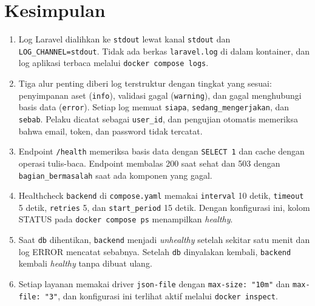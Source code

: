 \documentclass[a4paper,oneside,12pt]{report}
\begin{document}
\clearpage

\chapter{Kesimpulan}
\begin{enumerate}
    \item Log Laravel dialihkan ke \texttt{stdout} lewat kanal \texttt{stdout} dan \texttt{LOG\_CHANNEL=stdout}. Tidak ada berkas \texttt{laravel.log} di dalam kontainer, dan log aplikasi terbaca melalui \texttt{docker compose logs}.
    \item Tiga alur penting diberi log terstruktur dengan tingkat yang sesuai: penyimpanan aset (\texttt{info}), validasi gagal (\texttt{warning}), dan gagal menghubungi basis data (\texttt{error}). Setiap log memuat \texttt{siapa}, \texttt{sedang\_mengerjakan}, dan \texttt{sebab}. Pelaku dicatat sebagai \texttt{user\_id}, dan pengujian otomatis memeriksa bahwa email, token, dan password tidak tercatat.
    \item Endpoint \texttt{/health} memeriksa basis data dengan \texttt{SELECT 1} dan cache dengan operasi tulis-baca. Endpoint membalas 200 saat sehat dan 503 dengan \texttt{bagian\_bermasalah} saat ada komponen yang gagal.
    \item Healthcheck \texttt{backend} di \texttt{compose.yaml} memakai \texttt{interval} 10 detik, \texttt{timeout} 5 detik, \texttt{retries} 5, dan \texttt{start\_period} 15 detik. Dengan konfigurasi ini, kolom STATUS pada \texttt{docker compose ps} menampilkan \textit{healthy}.
    \item Saat \texttt{db} dihentikan, \texttt{backend} menjadi \textit{unhealthy} setelah sekitar satu menit dan log ERROR mencatat sebabnya. Setelah \texttt{db} dinyalakan kembali, \texttt{backend} kembali \textit{healthy} tanpa dibuat ulang.
    \item Setiap layanan memakai driver \texttt{json-file} dengan \texttt{max-size: "10m"} dan \texttt{max-file: "3"}, dan konfigurasi ini terlihat aktif melalui \texttt{docker inspect}.
\end{enumerate}

\clearpage
\end{document}
